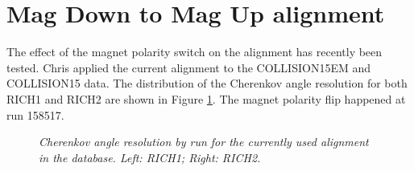 \clearpage

\section{Mag Down to Mag Up alignment}
The effect of the magnet polarity switch on the alignment has recently been tested. Chris applied the current alignment to the COLLISION15EM and COLLISION15 data. The distribution of the Cherenkov angle resolution for both RICH1 and RICH2 are shown in Figure \ref{fig:chris}. The magnet polarity flip happened at run 158517.\\
\begin{figure}[!h]
	\vspace*{-0.cm}
	\begin{center}
		\vspace*{-0.5cm}
	\end{center}
	\caption{\textit{Cherenkov angle resolution by run for the currently used alignment in the database. Left: RICH1; Right: RICH2.} }
	\label{fig:chris}
\end{figure}

